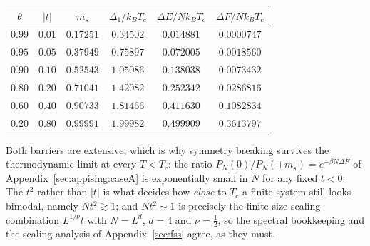 \documentclass[10pt,a4paper]{article}
\theoremstyle{remark}
\begin{document}
\begin{center}
\begin{tabular}{cccccc}
\toprule
$\theta$ & $|t|$ & $m_s$ & $\Delta_1/k_BT_c$ & $\Delta E/Nk_BT_c$
& $\Delta F/Nk_BT_c$ \\
\midrule
$0.99$ & $0.01$ & $0.17251$ & $0.34502$ & $0.014881$ & $0.0000747$ \\
$0.95$ & $0.05$ & $0.37949$ & $0.75897$ & $0.072005$ & $0.0018560$ \\
$0.90$ & $0.10$ & $0.52543$ & $1.05086$ & $0.138038$ & $0.0073432$ \\
$0.80$ & $0.20$ & $0.71041$ & $1.42082$ & $0.252342$ & $0.0286816$ \\
$0.60$ & $0.40$ & $0.90733$ & $1.81466$ & $0.411630$ & $0.1082834$ \\
$0.20$ & $0.80$ & $0.99991$ & $1.99982$ & $0.499909$ & $0.3613797$ \\
\bottomrule
\end{tabular}
\end{center}

Both barriers are extensive, which is why symmetry breaking survives the
thermodynamic limit at every $T<T_c$: the ratio $P_N(0)/P_N(\pm m_s)=e^{-\beta
N\Delta F}$ of Appendix~\ref{sec:appising:caseA} is exponentially small in $N$ for
any fixed $t<0$. The $t^{2}$ rather than $|t|$ is what decides how \emph{close}
to $T_c$ a finite system still looks bimodal, namely $N t^{2}\gtrsim1$; and
$Nt^{2}\sim1$ is precisely the finite-size scaling combination $L^{1/\nu}t$ with
$N=L^{d}$, $d=4$ and $\nu=\tfrac12$, so the spectral bookkeeping and the scaling
analysis of Appendix~\ref{sec:fss} agree, as they must.
\end{document}

